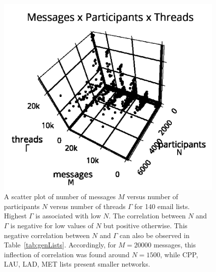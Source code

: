 \documentclass[%
aip,
jmp,%
amsmath,amssymb,
reprint,%
]{revtex4-1}
\begin{document}
\begin{figure}
\centering
\includegraphics[trim={0 0 0 1cm},clip,width=.7\columnwidth]{figs/mpgamma2_}
\caption{A scatter plot of number of messages $M$ versus number of participants $N$ versus number of threads $\Gamma$ for 140 email lists.
Highest $\Gamma$ is associated with low $N$.
The correlation between $N$ and $\Gamma$ is negative for low values of $N$ but positive otherwise.
This negative correlation between $N$ and $\Gamma$ can also be observed in Table~\ref{tab:genLists}.
Accordingly, for $M=20000$ messages, this inflection
of correlation was found around $N=1500$, while CPP, LAU, LAD, MET lists 
present smaller networks.}
\label{fig:nmgamma3d}
\end{figure}



\end{document}
